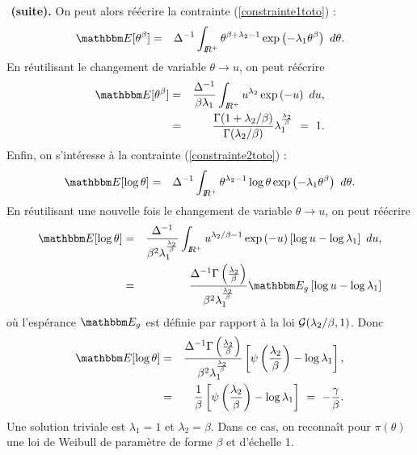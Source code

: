 \begin{rep}{ ${}^{}$ {\bf (suite). }}
On peut alors réécrire la contrainte (\ref{constrainte1toto}) : 
\begin{eqnarray*}
\E[\theta^{\beta}] & = & \Delta^{-1} \int_{\R^+} \theta^{\beta+\lambda_2-1} \exp\left(-\lambda_1\theta^{\beta}\right) \ d\theta.
\end{eqnarray*}
En réutilisant le changement de variable $\theta\to u$, on peut réécrire
\begin{eqnarray*}
\E[\theta^{\beta}] & = & \frac{\Delta^{-1}}{\beta\lambda_1} \int_{\R^+} u^{\lambda_2} \exp\left(-u\right) \ du, \\
                            & = & \frac{\Gamma(1+\lambda_2/\beta)}{\Gamma(\lambda_2/\beta)} \lambda^{\frac{\lambda_2}{\beta}}_1 \ = \ 1.
\end{eqnarray*}
Enfin, on s'intéresse à la contrainte (\ref{constrainte2toto}) :
\begin{eqnarray*}
\E[\log\theta] & = & \Delta^{-1} \int_{\R^+}  \theta^{\lambda_2-1} \log\theta \exp\left(-\lambda_1\theta^{\beta}\right) \ d\theta.
\end{eqnarray*}
En réutilisant une nouvelle fois le changement de variable $\theta\to u$, on peut réécrire
\begin{eqnarray*}
\E[\log\theta] & = & \frac{\Delta^{-1}}{\beta^2\lambda^{\frac{\lambda_2}{\beta}}_1} \int_{\R^+} u^{\lambda_2/\beta-1} \exp\left(-u\right)\left[\log u - \log \lambda_1 \right] \ du, \\
                            & = &  \frac{\Delta^{-1} \Gamma\left(\frac{\lambda_2}{\beta}\right)}{\beta^2\lambda^{\frac{\lambda_2}{\beta}}_1} \E_{g}\left[ \log u- \log\lambda_1\right]\end{eqnarray*} 
où l'espérance $\E_{g}$ est définie par rapport à la loi ${\cal{G}}(\lambda_2/\beta,1)$. Donc
\begin{eqnarray*}
\E[\log\theta] & = &  \frac{\Delta^{-1} \Gamma\left(\frac{\lambda_2}{\beta}\right)}{\beta^2\lambda^{\frac{\lambda_2}{\beta}}_1} \left[\psi\left(\frac{\lambda_2}{\beta}\right) -  \log\lambda_1\right], \\
& = & \frac{1}{\beta}  \left[\psi\left(\frac{\lambda_2}{\beta}\right) -  \log\lambda_1\right] \ = \ - \frac{\gamma}{\beta}.
\end{eqnarray*} 
Une solution triviale est $\lambda_1=1$ et $\lambda_2=\beta$. Dans ce cas, on reconnaît pour $\pi(\theta)$ une loi de Weibull de paramètre de forme $\beta$ et d'échelle 1. 
\end{rep}